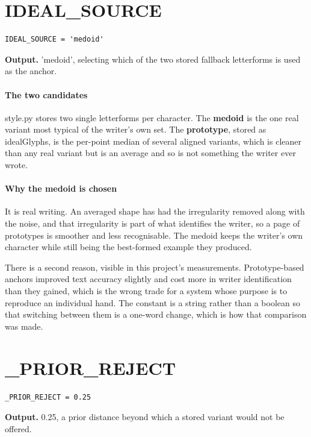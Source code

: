 \section{IDEAL\_SOURCE}
\begin{lstlisting}[style=sig]
IDEAL_SOURCE = 'medoid'
\end{lstlisting}

\noindent\textbf{Output.} 'medoid', selecting which of the two stored fallback letterforms is used as the anchor.


\paragraph{The two candidates}
style.py stores two single letterforms per character. The \textbf{medoid} is the one real variant most typical of the writer's own set. The \textbf{prototype}, stored as idealGlyphs, is the per-point median of several aligned variants, which is cleaner than any real variant but is an average and so is not something the writer ever wrote.


\paragraph{Why the medoid is chosen}
It is real writing. An averaged shape has had the irregularity removed along with the noise, and that irregularity is part of what identifies the writer, so a page of prototypes is smoother and less recognisable. The medoid keeps the writer's own character while still being the best-formed example they produced.

There is a second reason, visible in this project's measurements. Prototype-based anchors improved text accuracy slightly and cost more in writer identification than they gained, which is the wrong trade for a system whose purpose is to reproduce an individual hand. The constant is a string rather than a boolean so that switching between them is a one-word change, which is how that comparison was made.


\section{\_PRIOR\_REJECT}
\begin{lstlisting}[style=sig]
_PRIOR_REJECT = 0.25
\end{lstlisting}

\noindent\textbf{Output.} 0.25, a prior distance beyond which a stored variant would not be offered.


